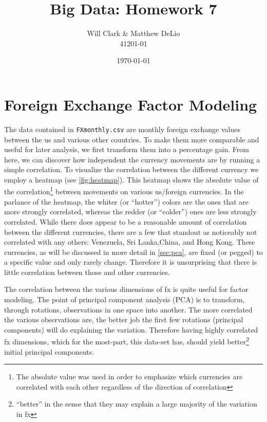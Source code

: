\documentclass[11pt, fleqn]{article}
\begin{document}
\title{Big Data: Homework 7}
\author{Will Clark \& Matthew DeLio \\ 41201-01}
\date{\today}
\maketitle

\section{Foreign Exchange Factor Modeling} \label{sec:intro}
The data contained in \texttt{FXmonthly.csv} are monthly foreign exchange values between the us and various other countries.  To make them more comparable and useful for later analysis, we first transform them into a percentage gain.  From here, we can discover how independent the currency movements are by running a simple correlation.  To visualize the correlation between the different currency we employ a heatmap (see \vref{fig:heatmap}).  This heatmap shows the absolute value of the correlation\footnote{The absolute value was used in order to emphasize which currencies are correlated with each other regardless of the direction of correlation} between movements on various us/foreign currencies.  In the parlance of the heatmap, the whiter (or ``hotter'') colors are the ones that are more strongly correlated, whereas the redder (or ``colder'') ones are less strongly correlated.  While there does appear to be a reasonable amount of correlation between the different currencies, there are a few that standout as noticeably not correlated with any others: Venezuela, Sri Lanka,China, and Hong Kong.  These currencies, as will be discussed in more detail in \cref{sec:pca}, are fixed (or pegged) to a specific value and only rarely change.  Therefore it is unsurprising that there is little correlation between those and other currencies.

The correlation between the various dimensions of fx is quite useful for factor modeling.  The point of principal component analysis (PCA) is to transform, through rotations, observations in one space into another.  The more correlated the various observations are, the better job the first few rotations (principal components) will do explaining the variation.  Therefore having highly correlated fx dimensions, which for the most-part, this data-set has, should yield better\footnote{``better'' in the sense that they may explain a large majority of the variation in fx} initial principal components.
\end{document}
